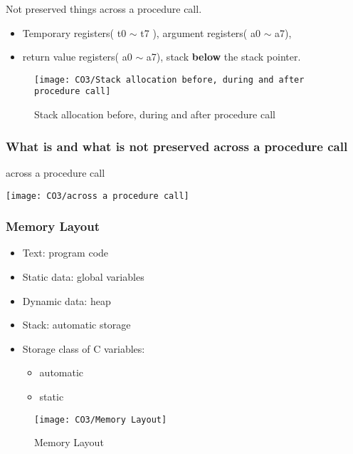 Not preserved things across a procedure call. 
\begin{itemize}
    \item\small Temporary registers( t0 $\sim$ t7 ), argument registers( a0 $\sim$ a7),
    \item\small return value registers( a0 $\sim$ a7), stack \textbf{below} the stack pointer.
\end{itemize}

\begin{figure}[!htb]
    \centering
    \texttt{[image: CO3/Stack allocation before, during and after procedure call]}
    \caption{Stack allocation before, during and after procedure call}
\end{figure}

\subsubsection{What is and what is not preserved across a procedure call}
\begin{table}[!htb]
    \centering
    \caption{across a procedure call}
    \texttt{[image: CO3/across a procedure call]}
\end{table}


\subsubsection{Memory Layout}


\begin{itemize}
    \item Text: program code
    \item Static data: global variables
    \item Dynamic data: heap
    \item Stack: automatic storage
    \item Storage class of C variables: 
    \begin{itemize}
        \item automatic
        \item static
    \end{itemize}
\end{itemize}

\begin{figure}[!htb]
    \centering
    \texttt{[image: CO3/Memory Layout]}
    \caption{Memory Layout}
\end{figure}


